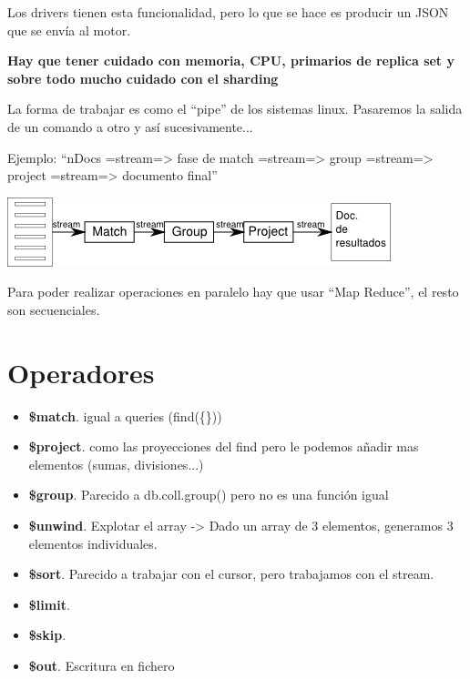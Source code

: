 \documentclass[a4paper,10pt,english]{sphinxmanual}
\begin{document}
Los drivers tienen esta funcionalidad, pero lo que se hace es producir un JSON que se envía al motor.

\textbf{Hay que tener cuidado con memoria, CPU, primarios de replica set y sobre todo mucho cuidado con el sharding}

La forma de trabajar es como el ``pipe'' de los sistemas linux. Pasaremos la salida de un comando a otro y así sucesivamente...

Ejemplo: ``nDocs =stream=\textgreater{} fase de match =stream=\textgreater{} group =stream=\textgreater{} project =stream=\textgreater{} documento final''

\includegraphics{aggregationFramework.png}

Para poder realizar operaciones en paralelo hay que usar ``Map Reduce'', el resto son secuenciales.


\section{Operadores}
\label{contents/aggregationFramework:operadores}\begin{itemize}
\item {} 
\textbf{\$match}. igual a queries (find(\{\}))

\item {} 
\textbf{\$project}. como las proyecciones del find pero le podemos añadir mas elementos (sumas, divisiones...)

\item {} 
\textbf{\$group}. Parecido a db.coll.group() pero no es una función igual

\item {} 
\textbf{\$unwind}. Explotar el array -\textgreater{} Dado un array de 3 elementos, generamos 3 elementos individuales.

\item {} 
\textbf{\$sort}. Parecido a trabajar con el cursor, pero trabajamos con el stream.

\item {} 
\textbf{\$limit}.

\item {} 
\textbf{\$skip}.

\item {} 
\textbf{\$out}. Escritura en fichero

\end{itemize}
\end{document}
